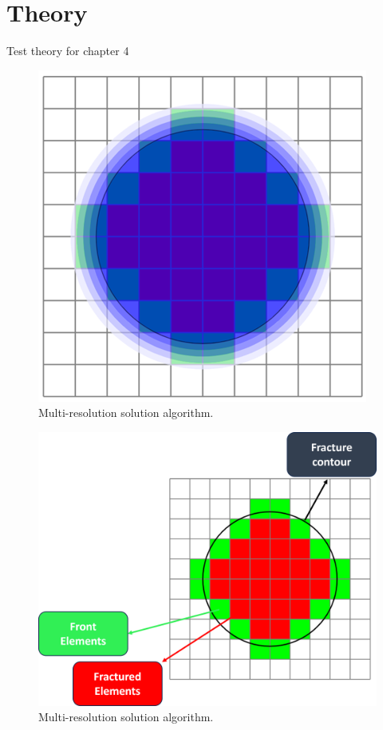 \section{Theory}
\label{section: Chapter4/theory}

Test theory for chapter 4

\begin{figure}[h]
    \centering
    \includegraphics[width=0.5\linewidth]{Chapter4/figures/blue_circle.png}
    \caption{Multi-resolution solution algorithm.}
    \label{fig:lorem1}
\end{figure}

\begin{figure}[h]
    \centering
    \includegraphics[width=\linewidth]{Chapter4/figures/penny_with_descriptions.png}
    \caption{Multi-resolution solution algorithm.}
    \label{fig:lorem4}
\end{figure}

